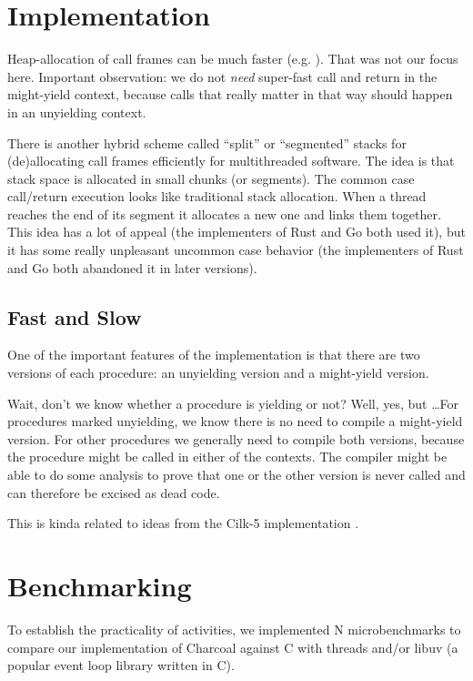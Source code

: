 \documentclass[10pt,preprint]{sigplanconf}
\begin{document}
\section{Implementation}

Heap-allocation of call frames can be much faster
(e.g. \cite{Shao2000}).  That was not our focus here.  Important
observation: we do not \emph{need} super-fast call and return in the
might-yield context, because calls that really matter in that way should
happen in an unyielding context.

There is another hybrid scheme called ``split'' or ``segmented'' stacks
for (de)allocating call frames efficiently for multithreaded software.
The idea is that stack space is allocated in small chunks (or segments).
The common case call/return execution looks like traditional stack
allocation.  When a thread reaches the end of its segment it allocates a
new one and links them together.  This idea has a lot of appeal (the
implementers of Rust and Go both used it), but it has some really
unpleasant uncommon case behavior (the implementers of Rust and Go both
abandoned it in later versions).

\subsection{Fast and Slow}

One of the important features of the implementation is that there are
two versions of each procedure: an unyielding version and a might-yield
version.

Wait, don't we know whether a procedure is yielding or not?  Well, yes,
but \ldots For procedures marked unyielding, we know there is no need to
compile a might-yield version.  For other procedures we generally need
to compile both versions, because the procedure might be called in
either of the contexts.  The compiler might be able to do some analysis
to prove that one or the other version is never called and can therefore
be excised as dead code.

This is kinda related to ideas from the Cilk-5 implementation
\cite{Frigo1998}.

\section{Benchmarking}

To establish the practicality of activities, we implemented N
microbenchmarks to compare our implementation of Charcoal against C with
threads and/or libuv (a popular event loop library written in C).
\end{document}

